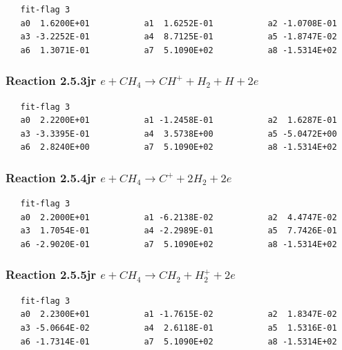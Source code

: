 \documentclass[12pt,dvipdfmx]{article}
\begin{document}
\begin{small}\begin{verbatim}
   fit-flag 3
   a0  1.6200E+01           a1  1.6252E-01           a2 -1.0708E-01
   a3 -3.2252E-01           a4  8.7125E-01           a5 -1.8747E-02
   a6  1.3071E-01           a7  5.1090E+02           a8 -1.5314E+02
 \end{verbatim}\end{small}


\subsubsection{
Reaction 2.5.3jr     $e + CH_{4} \rightarrow CH^{+} + H_{2} + H + 2e $
}

\begin{small}\begin{verbatim}
   fit-flag 3
   a0  2.2200E+01           a1 -1.2458E-01           a2  1.6287E-01
   a3 -3.3395E-01           a4  3.5738E+00           a5 -5.0472E+00
   a6  2.8240E+00           a7  5.1090E+02           a8 -1.5314E+02
 \end{verbatim}\end{small}


\subsubsection{
Reaction 2.5.4jr     $e + CH_{4} \rightarrow C^{+} + 2H_{2} + 2e $
}

\begin{small}\begin{verbatim}
   fit-flag 3
   a0  2.2000E+01           a1 -6.2138E-02           a2  4.4747E-02
   a3  1.7054E-01           a4 -2.2989E-01           a5  7.7426E-01
   a6 -2.9020E-01           a7  5.1090E+02           a8 -1.5314E+02
 \end{verbatim}\end{small}


\subsubsection{
Reaction 2.5.5jr     $e + CH_{4} \rightarrow CH_{2} + H_{2}^{+} + 2e $
}

\begin{small}\begin{verbatim}
   fit-flag 3
   a0  2.2300E+01           a1 -1.7615E-02           a2  1.8347E-02
   a3 -5.0664E-02           a4  2.6118E-01           a5  1.5316E-01
   a6 -1.7314E-01           a7  5.1090E+02           a8 -1.5314E+02
 \end{verbatim}\end{small}
\end{document}
